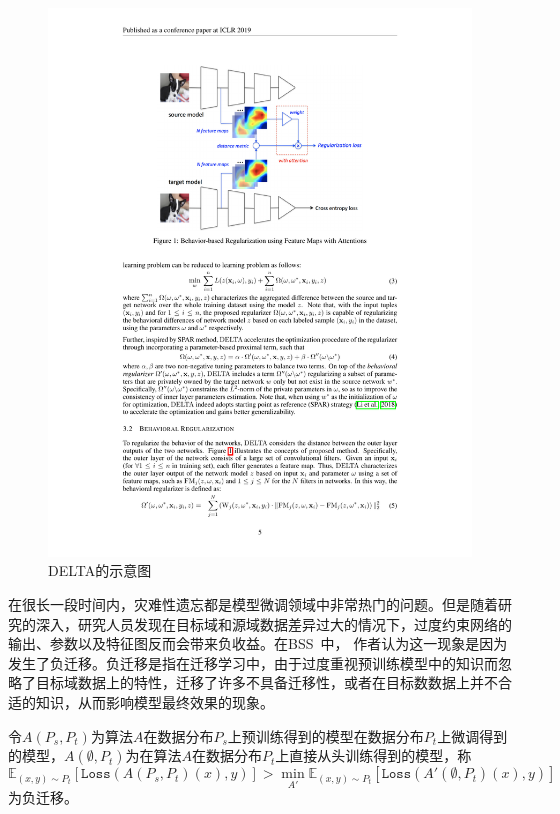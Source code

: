 \begin{figure}
    \centering
    \includegraphics[width=0.8\linewidth]{figures/delta.pdf}
    \caption{DELTA的示意图~\citep{li2018delta}}
    \label{fig:delta}
\end{figure}

在很长一段时间内，灾难性遗忘都是模型微调领域中非常热门的问题。但是随着研究的深入，研究人员发现在目标域和源域数据差异过大的情况下，过度约束网络的输出、参数以及特征图反而会带来负收益。在BSS~\citep{chen2019catastrophic}中，
作者认为这一现象是因为发生了负迁移。负迁移是指在迁移学习中，由于过度重视预训练模型中的知识而忽略了目标域数据上的特性，迁移了许多不具备迁移性，或者在目标数数据上并不合适的知识，从而影响模型最终效果的现象。

\begin{definition}
    令$A(P_s,P_t)$为算法$A$在数据分布$P_s$上预训练得到的模型在数据分布$P_t$上微调得到的模型，$A(\emptyset,P_t)$为在算法$A$在数据分布$P_t$上直接从头训练得到的模型，称
    \begin{equation}
        \mathbb{E}_{(x,y)\sim P_t}[\texttt{Loss}(A(P_s,P_t)(x),y)] > \mathop {\min} \limits_{ A'} \mathbb{E}_{(x,y)\sim P_t}[\texttt{Loss}(A'(\emptyset,P_t)(x),y)]
    \end{equation}
    为负迁移。
\end{definition} 

